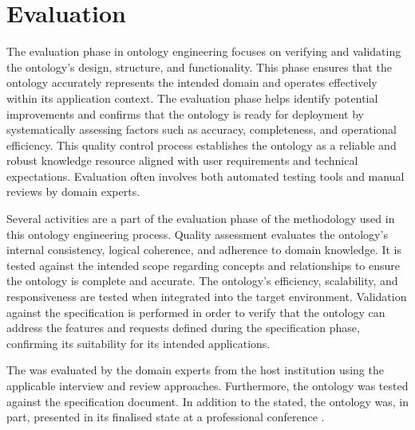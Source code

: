 \chapter{Evaluation}\label{ch: Evaluation}

The evaluation phase in ontology engineering focuses on verifying and validating the ontology's design, structure, and functionality. This phase ensures that the ontology accurately represents the intended domain and operates effectively within its application context. The evaluation phase helps identify potential improvements and confirms that the ontology is ready for deployment by systematically assessing factors such as accuracy, completeness, and operational efficiency. This quality control process establishes the ontology as a reliable and robust knowledge resource aligned with user requirements and technical expectations. Evaluation often involves both automated testing tools and manual reviews by domain experts.

Several activities are a part of the evaluation phase of the methodology used in this ontology engineering process. 
Quality assessment evaluates the ontology’s internal consistency, logical coherence, and adherence to domain knowledge.
It is tested against the intended scope regarding concepts and relationships to ensure the ontology is complete and accurate. 
The ontology's efficiency, scalability, and responsiveness are tested when integrated into the target environment.
Validation against the specification is performed in order to verify that the ontology can address the features and requests defined during the specification phase, confirming its suitability for its intended applications.

The \magoontologyname was evaluated by the domain experts from the host institution using the applicable interview and review approaches. Furthermore, the ontology was tested against the specification document.
%
In addition to the stated, the ontology was, in part, presented in its finalised state at a professional conference \cite{okresaduric2024OntologyActionStreamlining}.